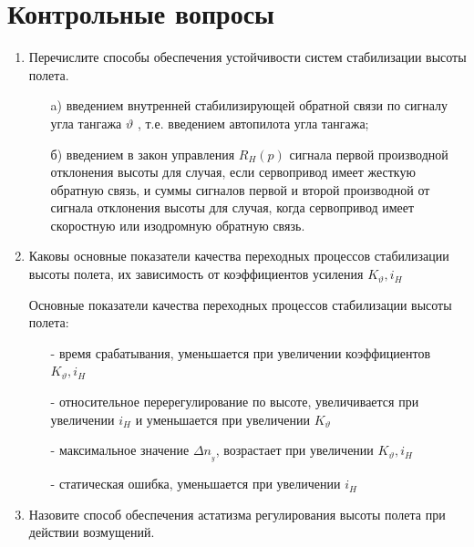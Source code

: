                     \section{Контрольные вопросы}
                    \begin{enumerate}
                        \item Перечислите способы обеспечения устойчивости систем стабилизации высоты полета. 
                        \begin{itemize}
                            \item [a)] введением внутренней  стабилизирующей обратной связи по сигналу угла тангажа $\vartheta$ , т.е. введением автопилота угла тангажа;
                            \item [б)] введением в закон управления $R_H(p)$  сигнала первой производной отклонения высоты для случая, если сервопривод имеет жесткую обратную связь, и суммы сигналов первой и второй производной от сигнала отклонения высоты для случая, когда сервопривод имеет скоростную или изодромную обратную связь.
                        \end{itemize}
                        \item Каковы основные показатели качества переходных процессов стабилизации высоты полета, их зависимость от коэффициентов усиления $ K_{\vartheta}, i_H$ 
                        
                        Основные показатели качества переходных процессов стабилизации высоты полета:
                        \begin{itemize}
                            \item [-] время срабатывания, уменьшается при увеличении коэффициентов $ K_{\vartheta}, i_H$
                            \item [-] относительное перерегулирование по высоте, увеличивается при увеличении $i_H$ и уменьшается при увеличении $K_{\vartheta}$
                            \item [-] максимальное значение $\Delta n__y$, возрастает при увеличении $ K_{\vartheta}, i_H$ 
                            \item [-] статическая ошибка, уменьшается при увеличении $i_H$ 
                        \end{itemize}
                        \item Назовите способ обеспечения астатизма регулирования высоты полета при действии возмущений.
                        

\end{enumerate}
